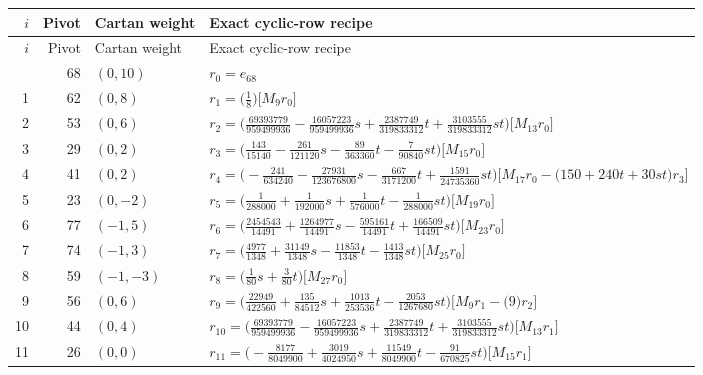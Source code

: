 \begingroup\footnotesize\setlength{\lineskip}{2pt}\setlength{\lineskiplimit}{2pt}
\setlength{\tabcolsep}{5pt}
\begin{longtable}{@{}rrlP{.64\linewidth}@{}}
\toprule
$i$ & Pivot & Cartan weight & Exact cyclic-row recipe\\
\midrule\endfirsthead
\toprule
$i$ & Pivot & Cartan weight & Exact cyclic-row recipe\\
\midrule\endhead
\bottomrule{} & 68 & $(0,10)$ & $r_{0}=e_{68}$\\
1 & 62 & $(0,8)$ & $r_{1}=\bigl(\frac{1}{8}\bigr)\bigl[M_{9}r_{0}\bigr]$\\
2 & 53 & $(0,6)$ & $r_{2}=\bigl(\frac{69393779}{959499936}-\frac{16057223}{959499936}s+\allowbreak \frac{2387749}{319833312}t+\allowbreak \frac{3103555}{319833312}st\bigr)\bigl[M_{13}r_{0}\bigr]$\\
3 & 29 & $(0,2)$ & $r_{3}=\bigl(\frac{143}{15140}-\frac{261}{121120}s-\frac{89}{363360}t-\frac{7}{90840}st\bigr)\bigl[M_{15}r_{0}\bigr]$\\
4 & 41 & $(0,2)$ & $r_{4}=\bigl(-\frac{241}{634240}-\frac{27931}{123676800}s-\frac{667}{3171200}t+\allowbreak \frac{1591}{24735360}st\bigr)\bigl[M_{17}r_{0}-\allowbreak \bigl(150+\allowbreak 240t+\allowbreak 30st\bigr)r_{3}\bigr]$\\
5 & 23 & $(0,-2)$ & $r_{5}=\bigl(\frac{1}{288000}+\allowbreak \frac{1}{192000}s+\allowbreak \frac{1}{576000}t-\frac{1}{288000}st\bigr)\bigl[M_{19}r_{0}\bigr]$\\
6 & 77 & $(-1,5)$ & $r_{6}=\bigl(\frac{2454543}{14491}+\allowbreak \frac{1264977}{14491}s-\frac{595161}{14491}t+\allowbreak \frac{166509}{14491}st\bigr)\bigl[M_{23}r_{0}\bigr]$\\
7 & 74 & $(-1,3)$ & $r_{7}=\bigl(\frac{4977}{1348}+\allowbreak \frac{31149}{1348}s-\frac{11853}{1348}t-\frac{1413}{1348}st\bigr)\bigl[M_{25}r_{0}\bigr]$\\
8 & 59 & $(-1,-3)$ & $r_{8}=\bigl(\frac{1}{80}s+\allowbreak \frac{3}{80}t\bigr)\bigl[M_{27}r_{0}\bigr]$\\
9 & 56 & $(0,6)$ & $r_{9}=\bigl(\frac{22949}{422560}+\allowbreak \frac{135}{84512}s+\allowbreak \frac{1013}{253536}t-\frac{2053}{1267680}st\bigr)\bigl[M_{9}r_{1}-\allowbreak \bigl(9\bigr)r_{2}\bigr]$\\
10 & 44 & $(0,4)$ & $r_{10}=\bigl(\frac{69393779}{959499936}-\frac{16057223}{959499936}s+\allowbreak \frac{2387749}{319833312}t+\allowbreak \frac{3103555}{319833312}st\bigr)\bigl[M_{13}r_{1}\bigr]$\\
11 & 26 & $(0,0)$ & $r_{11}=\bigl(-\frac{8177}{8049900}+\allowbreak \frac{3019}{4024950}s+\allowbreak \frac{11549}{8049900}t-\frac{91}{670825}st\bigr)\bigl[M_{15}r_{1}\bigr]$\\

\end{longtable}
